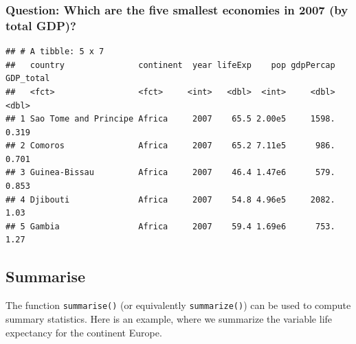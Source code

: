 \documentclass[12pt,]{article}
\newenvironment{Shaded}{\begin{snugshade}}{\end{snugshade}}
\newcommand{\KeywordTok}[1]{\textcolor[rgb]{0.13,0.29,0.53}{\textbf{#1}}}
\newcommand{\DataTypeTok}[1]{\textcolor[rgb]{0.13,0.29,0.53}{#1}}
\newcommand{\DecValTok}[1]{\textcolor[rgb]{0.00,0.00,0.81}{#1}}
\newcommand{\StringTok}[1]{\textcolor[rgb]{0.31,0.60,0.02}{#1}}
\newcommand{\OperatorTok}[1]{\textcolor[rgb]{0.81,0.36,0.00}{\textbf{#1}}}
\newcommand{\NormalTok}[1]{#1}
\begin{document}
\subsubsection{Question: Which are the five smallest economies in 2007
(by total
GDP)?}\label{question-which-are-the-five-smallest-economies-in-2007-by-total-gdp}

\begin{Shaded}
\end{Shaded}

\begin{verbatim}
## # A tibble: 5 x 7
##   country               continent  year lifeExp    pop gdpPercap GDP_total
##   <fct>                 <fct>     <int>   <dbl>  <int>     <dbl>     <dbl>
## 1 Sao Tome and Principe Africa     2007    65.5 2.00e5     1598.     0.319
## 2 Comoros               Africa     2007    65.2 7.11e5      986.     0.701
## 3 Guinea-Bissau         Africa     2007    46.4 1.47e6      579.     0.853
## 4 Djibouti              Africa     2007    54.8 4.96e5     2082.     1.03 
## 5 Gambia                Africa     2007    59.4 1.69e6      753.     1.27
\end{verbatim}

\subsection{Summarise}\label{summarise}

The function \texttt{summarise()} (or equivalently \texttt{summarize()})
can be used to compute summary statistics. Here is an example, where we
summarize the variable life expectancy for the continent Europe.

\begin{Shaded}
\end{Shaded}
\end{document}
